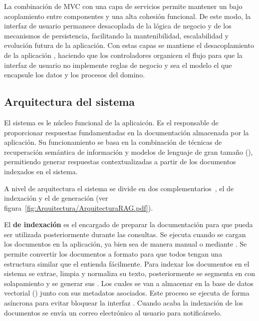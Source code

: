 La combinación de MVC con una capa de servicios permite mantener un bajo acoplamiento entre componentes y una alta cohesión funcional. De este modo, la interfaz de usuario permanece desacoplada de la lógica de negocio y de los mecanismos de persistencia, facilitando la mantenibilidad, escalabilidad y evolución futura de la aplicación.
Con estas capas se mantiene el desacoplamiento de la aplicación , haciendo que los controladores organicen el flujo para que la interfaz de usuario no implemente reglas de negocio y sea el modelo el que encapsule los datos y los procesos del domino. 

\subsection{Arquitectura del sistema }
El sistema  es le núcleo funcional de la aplicaicón. Es el responsable de proporcionar respuestas fundamentadas en la documentación almacenada por la aplicación. Su funcionamiento se basa en la combinación de técnicas de recuperación semántica de información y modelos de lenguaje de gran tamaño (), permitiendo generar respuestas contextualizadas a partir de los documentos indexados en el sistema.

A nivel de arquitectura el sistema se divide en dos  complementarios~\cite{book:RAG_SimpleGuide}, el de indexación y el de generación (ver figura~\ref{fig:Arquitectura/ArquitecturaRAG.pdf}).


El \textbf{ de indexación} es el encargado de preparar la documentación para que pueda ser utilizada posteriormente durante las consultas. Se ejecuta cuando se cargan los documentos en la aplicación, ya bien sea de manera manual o mediante . Se permite convertir los documentos a formato  para que todos tengan una estructura similar que el  entienda fácilmente. Para indexar los documentos en el sistema se extrae, limpia y normaliza su texto, posteriormente se segmenta en  con solapamiento y se generar sus . Los cuales se van a almacenar en la base de datos vectorial () junto con sus metadatos asociados. Este proceso se ejecuta de forma asíncrona para evitar bloquear la interfaz . Cuando acaba la indexación de los documentos se envía un correo electrónico al usuario para notificárselo.

